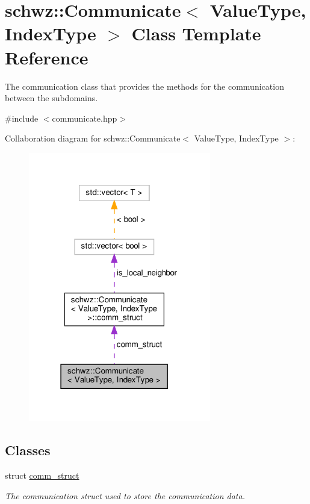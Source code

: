 \hypertarget{classschwz_1_1Communicate}{}\section{schwz\+:\+:Communicate$<$ Value\+Type, Index\+Type $>$ Class Template Reference}
\label{classschwz_1_1Communicate}


The communication class that provides the methods for the communication between the subdomains.  




{\ttfamily \#include $<$communicate.\+hpp$>$}



Collaboration diagram for schwz\+:\+:Communicate$<$ Value\+Type, Index\+Type $>$\+:
\nopagebreak
\begin{figure}[H]
\begin{center}
\leavevmode
\includegraphics[width=226pt]{classschwz_1_1Communicate__coll__graph}
\end{center}
\end{figure}
\subsection*{Classes}
\begin{DoxyCompactItemize}
\item 
struct \hyperlink{structschwz_1_1Communicate_1_1comm__struct}{comm\+\_\+struct}
\begin{DoxyCompactList}\small\item\em The communication struct used to store the communication data. \end{DoxyCompactList}\end{DoxyCompactItemize}
